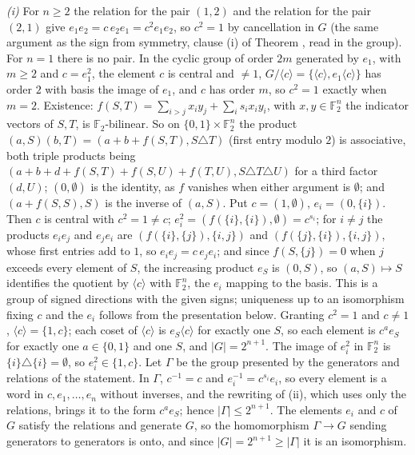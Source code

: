 \emph{(i)} For $n \ge 2$ the relation for the pair $(1, 2)$ and the relation for the pair $(2, 1)$ give $e_{1}e_{2} = c\,e_{2}e_{1} = c^{2}e_{1}e_{2}$, so $c^{2} = 1$ by cancellation in $G$ (the same argument as the sign from symmetry, clause (i) of Theorem , read in the group). For $n = 1$ there is no pair. In the cyclic group of order $2m$ generated by $e_{1}$, with $m \ge 2$ and $c = e_{1}^{2}$, the element $c$ is central and $\ne 1$, $G/\langle c\rangle = \{\langle c\rangle, e_{1}\langle c\rangle\}$ has order $2$ with basis the image of $e_{1}$, and $c$ has order $m$, so $c^{2} = 1$ exactly when $m = 2$. Existence: $f(S,T) = \sum_{i > j}x_{i}y_{j} + \sum_{i}s_{i}x_{i}y_{i}$, with $x, y \in \mathbb{F}_{2}^{n}$ the indicator vectors of $S, T$, is $\mathbb{F}_{2}$-bilinear. So on $\{0, 1\} \times \mathbb{F}_{2}^{n}$ the product $(a, S)(b, T) = (a + b + f(S,T), S \triangle T)$ (first entry modulo $2$) is associative, both triple products being $(a + b + d + f(S,T) + f(S,U) + f(T,U), S \triangle T \triangle U)$ for a third factor $(d, U)$; $(0, \emptyset)$ is the identity, as $f$ vanishes when either argument is $\emptyset$; and $(a + f(S,S), S)$ is the inverse of $(a, S)$. Put $c = (1, \emptyset)$, $e_{i} = (0, \{i\})$. Then $c$ is central with $c^{2} = 1 \ne c$; $e_{i}^{2} = (f(\{i\}, \{i\}), \emptyset) = c^{s_{i}}$; for $i \ne j$ the products $e_{i}e_{j}$ and $e_{j}e_{i}$ are $(f(\{i\},\{j\}), \{i, j\})$ and $(f(\{j\},\{i\}), \{i, j\})$, whose first entries add to $1$, so $e_{i}e_{j} = c\,e_{j}e_{i}$; and since $f(S, \{j\}) = 0$ when $j$ exceeds every element of $S$, the increasing product $e_{S}$ is $(0, S)$, so $(a, S) \mapsto S$ identifies the quotient by $\langle c\rangle$ with $\mathbb{F}_{2}^{n}$, the $e_{i}$ mapping to the basis. This is a group of signed directions with the given signs; uniqueness up to an isomorphism fixing $c$ and the $e_{i}$ follows from the presentation below. Granting $c^{2} = 1$ and $c \ne 1$, $\langle c\rangle = \{1, c\}$; each coset of $\langle c\rangle$ is $e_{S}\langle c\rangle$ for exactly one $S$, so each element is $c^{a}e_{S}$ for exactly one $a \in \{0, 1\}$ and one $S$, and $|G| = 2^{n+1}$. The image of $e_{i}^{2}$ in $\mathbb{F}_{2}^{n}$ is $\{i\} \triangle \{i\} = \emptyset$, so $e_{i}^{2} \in \{1, c\}$. Let $\Gamma$ be the group presented by the generators and relations of the statement. In $\Gamma$, $c^{-1} = c$ and $e_{i}^{-1} = c^{s_{i}}e_{i}$, so every element is a word in $c, e_{1}, \dots, e_{n}$ without inverses, and the rewriting of (ii), which uses only the relations, brings it to the form $c^{a}e_{S}$; hence $|\Gamma| \le 2^{n+1}$. The elements $e_{i}$ and $c$ of $G$ satisfy the relations and generate $G$, so the homomorphism $\Gamma \to G$ sending generators to generators is onto, and since $|G| = 2^{n+1} \ge |\Gamma|$ it is an isomorphism.

